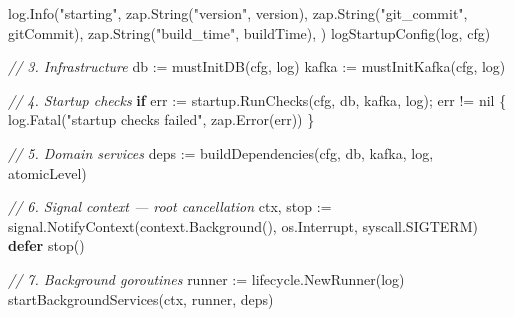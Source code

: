 \documentclass[
]{article}
\newenvironment{Shaded}{}{}
\newcommand{\CommentTok}[1]{\textcolor[rgb]{0.38,0.63,0.69}{\textit{#1}}}
\newcommand{\ControlFlowTok}[1]{\textcolor[rgb]{0.00,0.44,0.13}{\textbf{#1}}}
\newcommand{\NormalTok}[1]{#1}
\newcommand{\OperatorTok}[1]{\textcolor[rgb]{0.40,0.40,0.40}{#1}}
\newcommand{\OtherTok}[1]{\textcolor[rgb]{0.00,0.44,0.13}{#1}}
\newcommand{\StringTok}[1]{\textcolor[rgb]{0.25,0.44,0.63}{#1}}
\begin{document}
\begin{Shaded}
\begin{Highlighting}[]
\NormalTok{    log}\OperatorTok{.}\NormalTok{Info}\OperatorTok{(}\StringTok{"starting"}\OperatorTok{,}
\NormalTok{        zap}\OperatorTok{.}\NormalTok{String}\OperatorTok{(}\StringTok{"version"}\OperatorTok{,}\NormalTok{ version}\OperatorTok{),}
\NormalTok{        zap}\OperatorTok{.}\NormalTok{String}\OperatorTok{(}\StringTok{"git\_commit"}\OperatorTok{,}\NormalTok{ gitCommit}\OperatorTok{),}
\NormalTok{        zap}\OperatorTok{.}\NormalTok{String}\OperatorTok{(}\StringTok{"build\_time"}\OperatorTok{,}\NormalTok{ buildTime}\OperatorTok{),}
    \OperatorTok{)}
\NormalTok{    logStartupConfig}\OperatorTok{(}\NormalTok{log}\OperatorTok{,}\NormalTok{ cfg}\OperatorTok{)}

    \CommentTok{// 3. Infrastructure}
\NormalTok{    db    }\OperatorTok{:=}\NormalTok{ mustInitDB}\OperatorTok{(}\NormalTok{cfg}\OperatorTok{,}\NormalTok{ log}\OperatorTok{)}
\NormalTok{    kafka }\OperatorTok{:=}\NormalTok{ mustInitKafka}\OperatorTok{(}\NormalTok{cfg}\OperatorTok{,}\NormalTok{ log}\OperatorTok{)}

    \CommentTok{// 4. Startup checks}
    \ControlFlowTok{if}\NormalTok{ err }\OperatorTok{:=}\NormalTok{ startup}\OperatorTok{.}\NormalTok{RunChecks}\OperatorTok{(}\NormalTok{cfg}\OperatorTok{,}\NormalTok{ db}\OperatorTok{,}\NormalTok{ kafka}\OperatorTok{,}\NormalTok{ log}\OperatorTok{);}\NormalTok{ err }\OperatorTok{!=} \OtherTok{nil} \OperatorTok{\{}
\NormalTok{        log}\OperatorTok{.}\NormalTok{Fatal}\OperatorTok{(}\StringTok{"startup checks failed"}\OperatorTok{,}\NormalTok{ zap}\OperatorTok{.}\NormalTok{Error}\OperatorTok{(}\NormalTok{err}\OperatorTok{))}
    \OperatorTok{\}}

    \CommentTok{// 5. Domain services}
\NormalTok{    deps }\OperatorTok{:=}\NormalTok{ buildDependencies}\OperatorTok{(}\NormalTok{cfg}\OperatorTok{,}\NormalTok{ db}\OperatorTok{,}\NormalTok{ kafka}\OperatorTok{,}\NormalTok{ log}\OperatorTok{,}\NormalTok{ atomicLevel}\OperatorTok{)}

    \CommentTok{// 6. Signal context — root cancellation}
\NormalTok{    ctx}\OperatorTok{,}\NormalTok{ stop }\OperatorTok{:=}\NormalTok{ signal}\OperatorTok{.}\NormalTok{NotifyContext}\OperatorTok{(}\NormalTok{context}\OperatorTok{.}\NormalTok{Background}\OperatorTok{(),}\NormalTok{ os}\OperatorTok{.}\NormalTok{Interrupt}\OperatorTok{,}\NormalTok{ syscall}\OperatorTok{.}\NormalTok{SIGTERM}\OperatorTok{)}
    \ControlFlowTok{defer}\NormalTok{ stop}\OperatorTok{()}

    \CommentTok{// 7. Background goroutines}
\NormalTok{    runner }\OperatorTok{:=}\NormalTok{ lifecycle}\OperatorTok{.}\NormalTok{NewRunner}\OperatorTok{(}\NormalTok{log}\OperatorTok{)}
\NormalTok{    startBackgroundServices}\OperatorTok{(}\NormalTok{ctx}\OperatorTok{,}\NormalTok{ runner}\OperatorTok{,}\NormalTok{ deps}\OperatorTok{)}


\end{Highlighting}
\end{Shaded}
\end{document}
